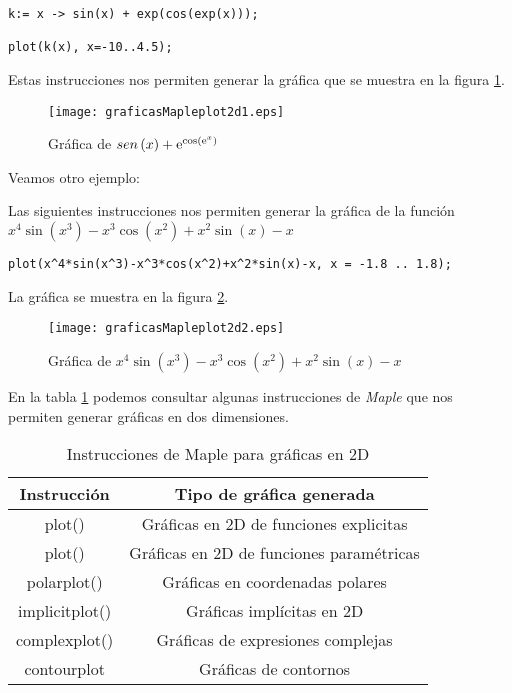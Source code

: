 \documentclass[letterpaper,12pt]{book}
\begin{document}
\begin{verbatim}
k:= x -> sin(x) + exp(cos(exp(x)));

plot(k(x), x=-10..4.5);
\end{verbatim}

Estas instrucciones nos permiten generar la gráfica que se muestra en la figura \ref{cap1f1}.

\begin{figure}[h!]
\centering
\texttt{[image: graficasMapleplot2d1.eps]}
\caption{Gráfica de $sen \left( x \right) +{{\rm e}^{\cos \left( {{\rm e}^{x}} \right) }}$}\label{cap1f1}
\end{figure}

Veamos otro ejemplo:

Las siguientes instrucciones nos permiten generar la gráfica de la función 
$\displaystyle {x}^{4}\sin \left( {x}^{3} \right) -{x}^{3}\cos \left( {x}^{2}
 \right) +{x}^{2}\sin \left( x \right) -x$

\begin{verbatim}
plot(x^4*sin(x^3)-x^3*cos(x^2)+x^2*sin(x)-x, x = -1.8 .. 1.8);
\end{verbatim}

La gráfica se muestra en la figura \ref{cap1f2}.

\begin{figure}[h!]
\centering
\texttt{[image: graficasMapleplot2d2.eps]}
\caption{Gráfica de ${x}^{4}\sin \left( {x}^{3} \right) -{x}^{3}\cos \left( {x}^{2}
 \right) +{x}^{2}\sin \left( x \right) -x$}\label{cap1f2}
\end{figure}

En la tabla \ref{tab:cap1t1} podemos consultar algunas instrucciones de \emph{Maple} que nos
permiten generar gráficas en dos dimensiones.

\begin{table}[h!]
	\caption{Instrucciones de Maple para gráficas en 2D}
	\begin{center}
		\begin{tabular}{|c|c|} \hline
			Instrucción & Tipo de gráfica generada \\ \hline
			plot() & Gráficas en 2D de funciones explicitas \\ \hline
			plot() & Gráficas en 2D de funciones paramétricas \\ \hline
			polarplot() & Gráficas en coordenadas polares \\ \hline
			implicitplot() & Gráficas implícitas en 2D \\ \hline
			complexplot() & Gráficas de expresiones complejas \\ \hline
			contourplot & Gráficas de contornos \\\hline
		\end{tabular}
	\end{center}
	\label{tab:cap1t1}
\end{table}
\end{document}
